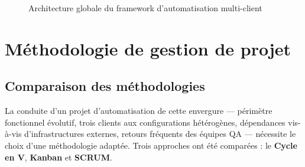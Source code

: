 \documentclass[12pt, a4paper]{report}
\begin{document}
\begin{figure}[H]
\caption{Architecture globale du framework d'automatisation multi-client}
\label{fig:archi_solution}
\end{figure}

\section{Méthodologie de gestion de projet}

\subsection{Comparaison des méthodologies}

La conduite d'un projet d'automatisation de cette envergure — périmètre fonctionnel évolutif, trois clients aux configurations hétérogènes, dépendances vis-à-vis d'infrastructures externes, retours fréquents des équipes QA — nécessite le choix d'une méthodologie adaptée. Trois approches ont été comparées : le \textbf{Cycle en V}, \textbf{Kanban} et \textbf{SCRUM}.
\end{document}

